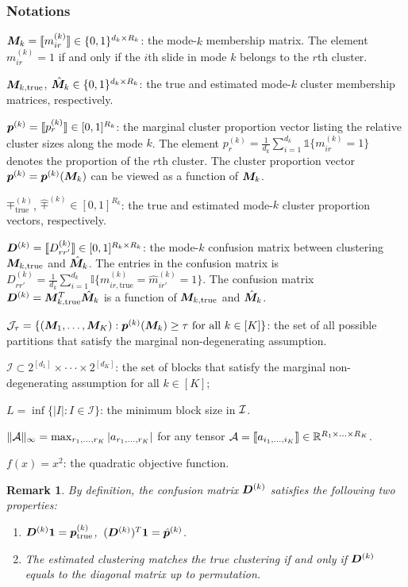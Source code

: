 \documentclass{article}
\newtheorem{remark}{Remark}
\begin{document}
\begin{appendices}
\subsubsection{Notations}\label{sec:notations}
$\bm M_{k}= \llbracket m_{ir}^{(k)} \rrbracket \in \{0,1\}^{d_k\times R_k}$: the mode-$k$ membership matrix. The element $m_{ir}^{(k)}=1$ if and only if the $i$th slide in mode $k$ belongs to the $r$th cluster.


$\bm M_{k,\text{true}}$, $\hat {\bm M}_{k} \in \{0,1\}^{d_k\times R_k}$: the true and estimated mode-$k$ cluster membership matrices, respectively.


$\bm{p}^{(k)} = \llbracket p^{(k)}_r \rrbracket \in [0,1]^{R_k}$: the marginal cluster proportion vector listing the relative cluster sizes along the mode $k$. The element $p_{r}^{(k)}=\frac{1}{d_k}\sum_{i=1}^{d_k}\mathds{1}\{m_{ir}^{(k)}=1\}$ denotes the proportion of the $r$th cluster. The cluster proportion vector $\bm{p}^{(k)}=\bm{p}^{(k)}(\bm M_k)$ can be viewed as a function of $\bm M_{k}$.

$ \mp^{(k)}_{\text{true}}$, $\hat \mp^{(k)} \in [0,1]^{R_k}$: the true and estimated mode-$k$ cluster proportion vectors, respectively.


$\bm{D}^{(k)} = \llbracket D^{(k)}_{rr'} \rrbracket\in [0,1]^{R_k\times R_k}$: the mode-$k$ confusion matrix between clustering $\bm M_{k,\text{true}}$ and $\hat {\bm M}_{k}$. The entries in the confusion matrix is $D_{rr'}^{(k)}=\frac{1}{d_k}\sum_{i=1}^{d_k}\mathbb{I}\{m_{ir,\text{true}}^{(k)}=\hat m_{ir'}^{(k)}=1\}$. The confusion matrix $\bm{D}^{(k)}=\bm M^T_{k,\text{true}}\hat {\bm M}_k$ is a function of $\bm M_{k,\text{true}}$ and $\hat {\bm M}_k$.

$\mathcal{J}_{\tau}=\{(\bm M_1,\ldots,\bm M_K): \bm{p}^{(k)}(\bm M_k)\geq \tau \text{ for all } k\in[K]\}$: the set of all possible partitions that satisfy the marginal non-degenerating assumption. 

$\mathcal{I} \subset 2^{[d_1]}\times \cdot\cdot\cdot \times 2^{[d_K]}$: the set of blocks that satisfy the marginal non-degenerating assumption for all $k\in[K]$;

$L=\inf\{|I|: I\in\mathcal{I}\}$: the minimum block size in $\mathcal{I}$. 

$\lVert\mathcal{A}\rVert_\infty=\max_{r_1,\ldots,r_K}|a_{r_1,\ldots,r_K}|$ for any tensor $\mathcal{A}=\llbracket a_{i_1,\ldots,i_K} \rrbracket\in\mathbb{R}^{R_1\times\ldots \times R_K}$.

$f(x)=x^2$: the quadratic objective function. 

\begin{remark}
By definition, the confusion matrix $\bm{D}^{(k)}$ satisfies the following two properties:
\begin{enumerate}
\item $\bm{D}^{(k)}\boldsymbol{1}=\bm{p}^{(k)}_{\text{true}}$,\ $(\bm{D}^{(k)})^T\boldsymbol{1} =\hat {\bm{p}}^{(k)}$.
\item The estimated clustering matches the true clustering if and only if $\bm{D}^{(k)}$ equals to the diagonal matrix up to permutation. 
\end{enumerate}
\end{remark}



\end{appendices}
\end{document}
